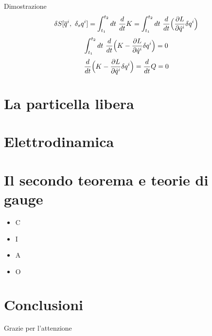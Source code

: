 \begin{frame}

    \begin{block}{Dimostrazione} 
        \begin{equation*}
            \delta S[\overline q^i, ~\delta_s q^i] = \int_{t_1}^{t_2}dt~ \frac{d}{dt} K = \int_{t_1}^{t_2}dt~ \frac{d}{dt} \Big( \frac{\partial L}{\partial\dot q^i} \delta q^i \Big )
        \end{equation*}
        \begin{equation*}
            \int_{t_1}^{t_2}dt~ \frac{d}{dt} \Big (K - \frac{\partial L}{\partial\dot q^i} \delta q^i \Big ) = 0
        \end{equation*}
        \begin{equation*}
            \frac{d}{dt} \Big (K - \frac{\partial L}{\partial\dot q^i} \delta q^i \Big ) = \frac{d}{dt} Q = 0
        \end{equation*}
    \end{block}

\end{frame}

\section{La particella libera}

\section{Elettrodinamica}

\section{Il secondo teorema e teorie di gauge}

\begin{frame}
    \begin{itemize}
        \item C
        \item I
        \item A
        \item O
    \end{itemize}
\end{frame}

\section{Conclusioni}

\begin{frame}
    \begin{center}
        Grazie per l'attenzione
    \end{center}
\end{frame}



